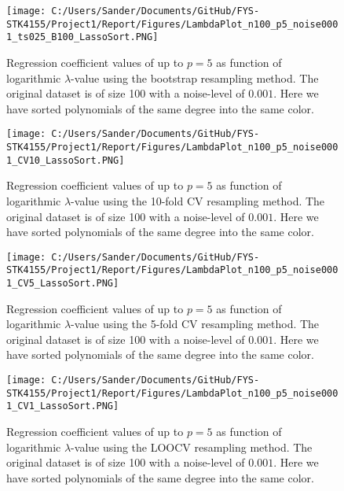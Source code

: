 \documentclass[12pt,a4paper]{article}
\begin{document}
\begin{figure}[H]
\centering
\texttt{[image: C:/Users/Sander/Documents/GitHub/FYS-STK4155/Project1/Report/Figures/LambdaPlot\_n100\_p5\_noise0001\_ts025\_B100\_LassoSort.PNG]}
\caption{\label{fig:LambdaLasso1} Regression coefficient values of up to $p = 5$ as function of logarithmic $\lambda$-value using the bootstrap resampling method. The original dataset is of size 100 with a noise-level of $0.001$. Here we have sorted polynomials of the same degree into the same color.}
\end{figure}

\begin{figure}[H]
\centering
\texttt{[image: C:/Users/Sander/Documents/GitHub/FYS-STK4155/Project1/Report/Figures/LambdaPlot\_n100\_p5\_noise0001\_CV10\_LassoSort.PNG]}
\caption{\label{fig:LambdaLasso2} Regression coefficient values of up to $p = 5$ as function of logarithmic $\lambda$-value using the 10-fold CV resampling method. The original dataset is of size 100 with a noise-level of $0.001$. Here we have sorted polynomials of the same degree into the same color.}
\end{figure}

\begin{figure}[H]
\centering
\texttt{[image: C:/Users/Sander/Documents/GitHub/FYS-STK4155/Project1/Report/Figures/LambdaPlot\_n100\_p5\_noise0001\_CV5\_LassoSort.PNG]}
\caption{\label{fig:LambdaLasso3} Regression coefficient values of up to $p = 5$ as function of logarithmic $\lambda$-value using the 5-fold CV resampling method. The original dataset is of size 100 with a noise-level of $0.001$. Here we have sorted polynomials of the same degree into the same color.}
\end{figure}

\begin{figure}[H]
\centering
\texttt{[image: C:/Users/Sander/Documents/GitHub/FYS-STK4155/Project1/Report/Figures/LambdaPlot\_n100\_p5\_noise0001\_CV1\_LassoSort.PNG]}
\caption{\label{fig:LambdaLasso4} Regression coefficient values of up to $p = 5$ as function of logarithmic $\lambda$-value using the LOOCV resampling method. The original dataset is of size 100 with a noise-level of $0.001$. Here we have sorted polynomials of the same degree into the same color.}
\end{figure}
\end{document}
